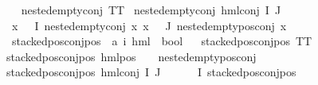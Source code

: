 \begin{isabellebody}
\ \ \isanewline
{\isachardoublequoteopen}nested{\isacharunderscore}{\kern0pt}empty{\isacharunderscore}{\kern0pt}conj\ TT{\isachardoublequoteclose}\ {\isacharbar}{\kern0pt}\isanewline
{\isachardoublequoteopen}nested{\isacharunderscore}{\kern0pt}empty{\isacharunderscore}{\kern0pt}conj\ {\isacharparenleft}{\kern0pt}hml{\isacharunderscore}{\kern0pt}conj\ I\ J\ {\isasymPhi}{\isacharparenright}{\kern0pt}{\isachardoublequoteclose}\isanewline
{}\ {\isachardoublequoteopen}{\isasymforall}x\ {\isasymin}\ {\isacharparenleft}{\kern0pt}{\isasymPhi}\ {\isacharbackquote}{\kern0pt}I{\isacharparenright}{\kern0pt}{\isachardot}{\kern0pt}\ nested{\isacharunderscore}{\kern0pt}empty{\isacharunderscore}{\kern0pt}conj\ x{\isachardoublequoteclose}\ {\isachardoublequoteopen}{\isasymforall}x\ {\isasymin}\ {\isacharparenleft}{\kern0pt}{\isasymPhi}\ {\isacharbackquote}{\kern0pt}J{\isacharparenright}{\kern0pt}{\isachardot}{\kern0pt}\ nested{\isacharunderscore}{\kern0pt}empty{\isacharunderscore}{\kern0pt}pos{\isacharunderscore}{\kern0pt}conj\ x{\isachardoublequoteclose}\isanewline
\isanewline
{}\isamarkupfalse%
\ stacked{\isacharunderscore}{\kern0pt}pos{\isacharunderscore}{\kern0pt}conj{\isacharunderscore}{\kern0pt}pos\ {\isacharcolon}{\kern0pt}{\isacharcolon}{\kern0pt}\ {\isachardoublequoteopen}{\isacharparenleft}{\kern0pt}{\isacharprime}{\kern0pt}a{\isacharcomma}{\kern0pt}\ {\isacharprime}{\kern0pt}i{\isacharparenright}{\kern0pt}\ hml\ {\isasymRightarrow}\ bool{\isachardoublequoteclose}\isanewline
\ \ \isanewline
{\isachardoublequoteopen}stacked{\isacharunderscore}{\kern0pt}pos{\isacharunderscore}{\kern0pt}conj{\isacharunderscore}{\kern0pt}pos\ TT{\isachardoublequoteclose}\ {\isacharbar}{\kern0pt}\isanewline
{\isachardoublequoteopen}stacked{\isacharunderscore}{\kern0pt}pos{\isacharunderscore}{\kern0pt}conj{\isacharunderscore}{\kern0pt}pos\ {\isacharparenleft}{\kern0pt}hml{\isacharunderscore}{\kern0pt}pos\ {\isacharunderscore}{\kern0pt}\ {\isasympsi}{\isacharparenright}{\kern0pt}{\isachardoublequoteclose}\ \ {\isachardoublequoteopen}nested{\isacharunderscore}{\kern0pt}empty{\isacharunderscore}{\kern0pt}pos{\isacharunderscore}{\kern0pt}conj\ {\isasympsi}{\isachardoublequoteclose}\ {\isacharbar}{\kern0pt}\isanewline
{\isachardoublequoteopen}stacked{\isacharunderscore}{\kern0pt}pos{\isacharunderscore}{\kern0pt}conj{\isacharunderscore}{\kern0pt}pos\ {\isacharparenleft}{\kern0pt}hml{\isacharunderscore}{\kern0pt}conj\ I\ J\ {\isasymPhi}{\isacharparenright}{\kern0pt}{\isachardoublequoteclose}\isanewline
{}\ {\isachardoublequoteopen}{\isacharparenleft}{\kern0pt}{\isacharparenleft}{\kern0pt}{\isasymexists}{\isasymphi}\ {\isasymin}\ {\isacharparenleft}{\kern0pt}{\isasymPhi}\ {\isacharbackquote}{\kern0pt}\ I{\isacharparenright}{\kern0pt}{\isachardot}{\kern0pt}\ {\isacharparenleft}{\kern0pt}{\isacharparenleft}{\kern0pt}stacked{\isacharunderscore}{\kern0pt}pos{\isacharunderscore}{\kern0pt}conj{\isacharunderscore}{\kern0pt}pos\ {\isasymphi}{\isacharparenright}{\kern0pt}\ {\isasymand}\ \isanewline

\end{isabellebody}
